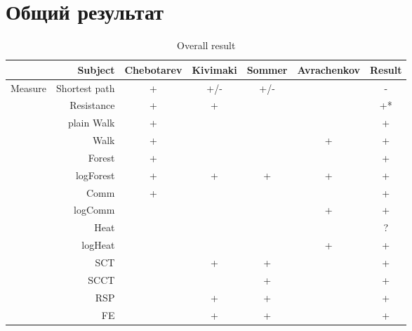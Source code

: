 \documentclass{article}
\begin{document}
\section*{Общий результат}

\begin{table}[H]
\centering
\caption{Overall result}
\label{my-label}
\begin{tabular}{rr|cccc|c}
                & Subject                  & Chebotarev & Kivimaki & Sommer & Avrachenkov & Result \\
                \hline
Measure         & Shortest path            & +          & \cellcolor{red!25} +/- & \cellcolor{red!25} +/- & & \cellcolor{red!25} - \\
                & Resistance               & +          & +        &        &             &  \cellcolor{yellow!25} +* \\
                & plain Walk               & +          &          &        &             & +      \\
                & Walk                     & +          &          &        & +           & +      \\
                & Forest                   & +          &          &        &             & +      \\
                & logForest                & +          & +        & +      & +           & +      \\
                & Comm                     & +          &          &        &             & +      \\
                & logComm                  &            &          &        & +           & +      \\
                & Heat                     &            &          &        &             & \cellcolor{yellow!25} ? \\
                & logHeat                  &            &          &        & +           & +      \\
                & SCT                      &            & +        & +      &             & +      \\
                & SCCT                     &            &          & +      &             & +      \\
                & RSP                      &            & +        & +      &             & +      \\
                & FE                       &            & +        & +      &             & +      \\

\end{tabular}
\end{table}
\end{document}
